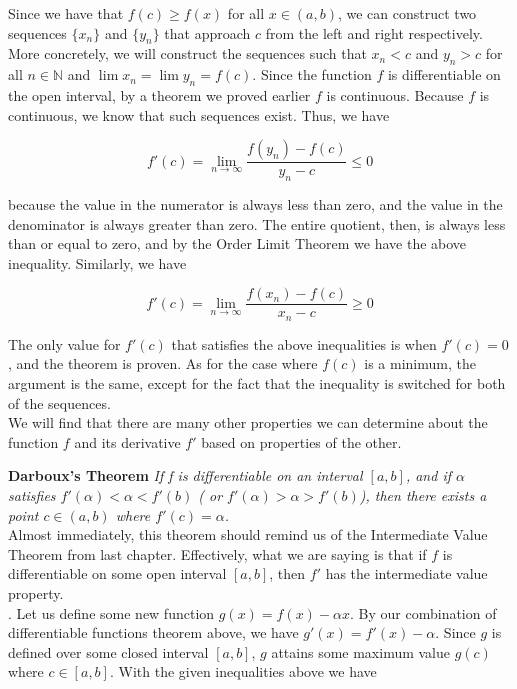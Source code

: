 \documentclass[12pt, letterpaper, twoside]{article}
\begin{document}
Since we have that $f(c) \geq f(x)$ for all $x \in (a, b)$, we can construct two sequences $\{x_n\}$ and $\{y_n\}$ that approach $c$ from the left and right respectively. More concretely, we will construct the sequences such that $x_n < c$ and $y_n > c$ for all $n \in \mathbb{N}$ and $\lim x_n = \lim y_n = f(c)$. Since the function $f$ is differentiable on the open interval, by a theorem we proved earlier $f$ is continuous. Because $f$ is continuous, we know that such sequences exist. Thus, we have

$$
    f'(c) = \lim_{n \to \infty} \frac{f(y_n) - f(c)}{y_n - c} \leq 0
$$

because the value in the numerator is always less than zero, and the value in the denominator is always greater than zero. The entire quotient, then, is always less than or equal to zero, and by the Order Limit Theorem we have the above inequality. Similarly, we have

$$
    f'(c) = \lim_{n \to \infty} \frac{f(x_n) - f(c)}{x_n - c} \geq 0
$$

The only value for $f'(c)$ that satisfies the above inequalities is when $f'(c) = 0$, and the theorem is proven. As for the case where $f(c)$ is a minimum, the argument is the same, except for the fact that the inequality is switched for both of the sequences. \\
 
We will find that there are many other properties we can determine about the function $f$ and its derivative $f'$ based on properties of the other. \newpage

\textbf{ Darboux's Theorem } \textit{If f is differentiable on an interval
$[a, b]$, and if $\alpha$ satisfies $f'(\alpha) < \alpha < f'(b)$ ( or $f'(\alpha) > \alpha > f'(b)$), then there exists a point $c \in (a, b)$ where $f'(c) = \alpha$.} \\

Almost immediately, this theorem should remind us of the Intermediate Value Theorem from last chapter. Effectively, what we are saying is that if $f$ is differentiable on some open interval $[a, b]$, then $f'$ has the intermediate value property. \\

. Let us define some new function $g(x) = f(x) - \alpha x$. By our combination of differentiable functions theorem above, we have $g'(x) = f'(x) - \alpha$. Since $g$ is defined over some closed interval $[a, b]$, $g$ attains some maximum value $g(c)$ where $c \in [a, b]$. With the given inequalities above we have 
\end{document}
